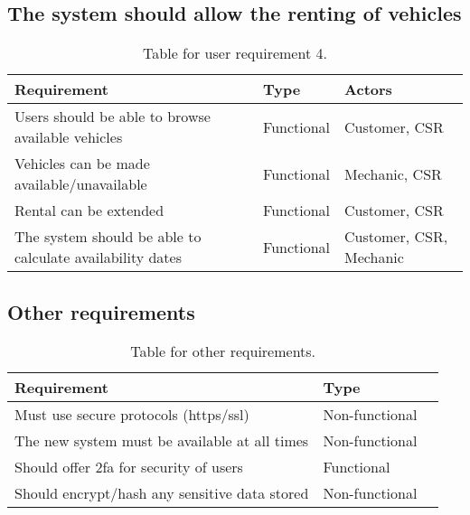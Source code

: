   \subsection{The system should allow the renting of vehicles}
    \begin{table}[H]
      \centering
      \begin{tabular}{|p{}|p{}|p{}|}
        \hline
        Requirement & Type & Actors \\ \hline
        Users should be able to browse available vehicles & Functional & Customer, CSR \\ \hline
        Vehicles can be made available/unavailable & Functional & Mechanic, CSR \\ \hline
        Rental can be extended & Functional & Customer, CSR \\ \hline
        The system should be able to calculate availability dates & Functional & Customer, CSR, Mechanic \\ \hline
      \end{tabular}
      \caption{Table for user requirement 4.}
    \end{table}
  
  \subsection{Other requirements}
    \begin{table}[H]
      \centering
      \begin{tabular}{|p{}|p{}|p{}|}
        \hline
        Requirement & Type \\ \hline
        Must use secure protocols (https/ssl) & Non-functional \\ \hline
        The new system must be available at all times & Non-functional \\ \hline
        Should offer 2fa for security of users & Functional \\ \hline
        Should encrypt/hash any sensitive data stored & Non-functional \\ \hline
      \end{tabular}
      \caption{Table for other requirements.}
    \end{table}

\newpage